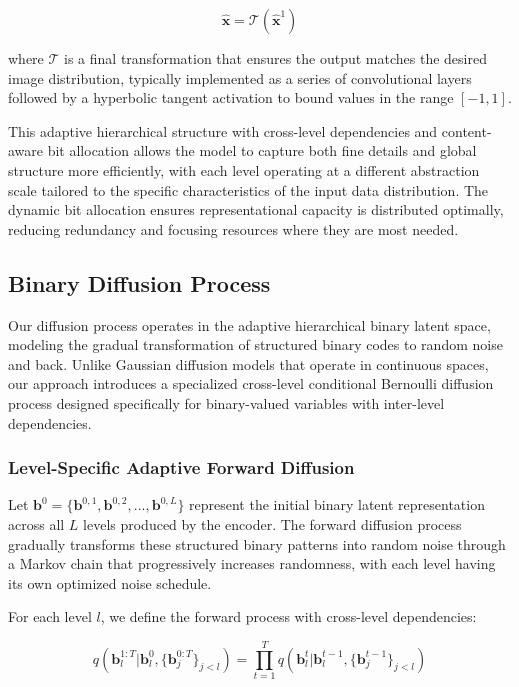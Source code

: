 \documentclass[10pt,twocolumn,letterpaper]{article}
\newcommand{\bm}[1]{\boldsymbol{#1}}
\newcommand{\binary}{\bm{b}}
\newcommand{\img}{\bm{x}}
\newcommand{\recon}{\hat{\bm{x}}}
\begin{document}
\begin{equation}
\recon = \mathcal{T}(\hat{\img}^1)
\end{equation}

where $\mathcal{T}$ is a final transformation that ensures the output matches the desired image distribution, typically implemented as a series of convolutional layers followed by a hyperbolic tangent activation to bound values in the range $[-1, 1]$.

This adaptive hierarchical structure with cross-level dependencies and content-aware bit allocation allows the model to capture both fine details and global structure more efficiently, with each level operating at a different abstraction scale tailored to the specific characteristics of the input data distribution. The dynamic bit allocation ensures representational capacity is distributed optimally, reducing redundancy and focusing resources where they are most needed.

\subsection{Binary Diffusion Process}
\label{sec:binary_diffusion}

Our diffusion process operates in the adaptive hierarchical binary latent space, modeling the gradual transformation of structured binary codes to random noise and back. Unlike Gaussian diffusion models that operate in continuous spaces, our approach introduces a specialized cross-level conditional Bernoulli diffusion process designed specifically for binary-valued variables with inter-level dependencies.

\subsubsection{Level-Specific Adaptive Forward Diffusion}
Let $\binary^0 = \{\binary^{0,1}, \binary^{0,2}, ..., \binary^{0,L}\}$ represent the initial binary latent representation across all $L$ levels produced by the encoder. The forward diffusion process gradually transforms these structured binary patterns into random noise through a Markov chain that progressively increases randomness, with each level having its own optimized noise schedule.

For each level $l$, we define the forward process with cross-level dependencies:

\begin{equation}
q(\binary_l^{1:T}|\binary_l^0, \{\binary_j^{0:T}\}_{j<l}) = \prod_{t=1}^{T} q(\binary_l^t|\binary_l^{t-1}, \{\binary_j^{t-1}\}_{j<l})
\end{equation}
\end{document}

